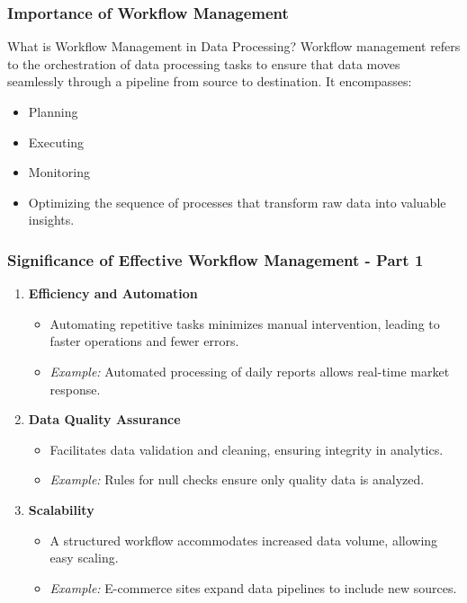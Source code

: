 \documentclass[aspectratio=169]{beamer}
\begin{document}
\begin{frame}[fragile]
    \frametitle{Importance of Workflow Management}
    \begin{block}{What is Workflow Management in Data Processing?}
        Workflow management refers to the orchestration of data processing tasks to ensure that data moves seamlessly through a pipeline from source to destination. It encompasses:
        \begin{itemize}
            \item Planning
            \item Executing
            \item Monitoring
            \item Optimizing the sequence of processes that transform raw data into valuable insights.
        \end{itemize}
    \end{block}
\end{frame}

\begin{frame}[fragile]
    \frametitle{Significance of Effective Workflow Management - Part 1}
    \begin{enumerate}
        \item \textbf{Efficiency and Automation}
        \begin{itemize}
            \item Automating repetitive tasks minimizes manual intervention, leading to faster operations and fewer errors.
            \item \textit{Example:} Automated processing of daily reports allows real-time market response.
        \end{itemize}

        \item \textbf{Data Quality Assurance}
        \begin{itemize}
            \item Facilitates data validation and cleaning, ensuring integrity in analytics.
            \item \textit{Example:} Rules for null checks ensure only quality data is analyzed.
        \end{itemize}

        \item \textbf{Scalability}
        \begin{itemize}
            \item A structured workflow accommodates increased data volume, allowing easy scaling.
            \item \textit{Example:} E-commerce sites expand data pipelines to include new sources.
        \end{itemize}
    \end{enumerate}
\end{frame}
\end{document}

